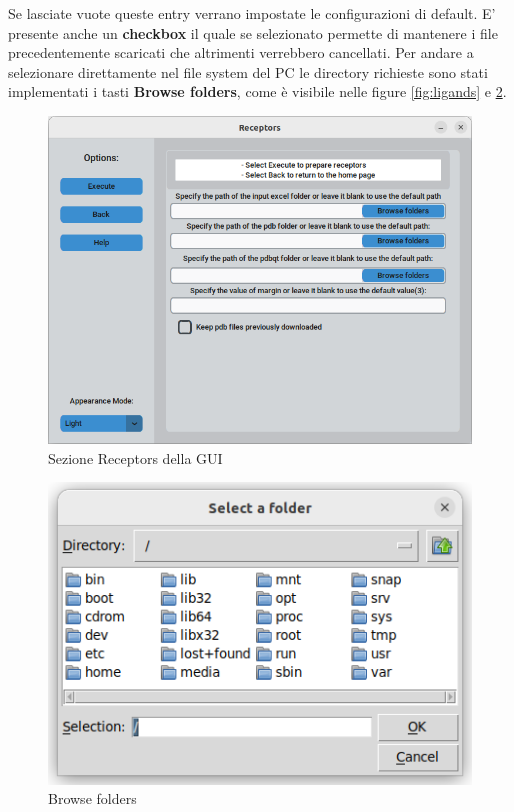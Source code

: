 Se lasciate vuote queste entry verrano impostate le configurazioni di default. E' presente anche un \textbf{checkbox} il quale se selezionato permette di mantenere i file precedentemente scaricati che altrimenti verrebbero cancellati.\newline
Per andare a selezionare direttamente nel file system del PC le directory richieste sono stati implementati i tasti \textbf{Browse folders}, come è visibile nelle figure \ref{fig:ligands} e \ref{fig:browse folders receptors}.

\begin{figure}[H]
    \centering
    \includegraphics[scale=0.6]{immagini/capitolo3/receptors.png}
    \caption{Sezione Receptors della GUI}
    \label{fig:receptors}
\end{figure}

\begin{figure}[H]
    \centering
    \includegraphics{immagini/capitolo3/browseFoldersReceptors.png}
    \caption{Browse folders}
    \label{fig:browse folders receptors}
\end{figure}

